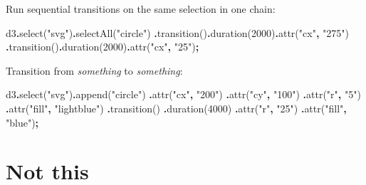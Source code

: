 \documentclass[
  openany]{book}
\newenvironment{Shaded}{\begin{snugshade}}{\end{snugshade}}
\newcommand{\DecValTok}[1]{\textcolor[rgb]{0.00,0.00,0.81}{#1}}
\newcommand{\FunctionTok}[1]{\textcolor[rgb]{0.00,0.00,0.00}{#1}}
\newcommand{\NormalTok}[1]{#1}
\newcommand{\OperatorTok}[1]{\textcolor[rgb]{0.81,0.36,0.00}{\textbf{#1}}}
\newcommand{\StringTok}[1]{\textcolor[rgb]{0.31,0.60,0.02}{#1}}
\begin{document}
Run sequential transitions on the same selection in one chain:

\begin{Shaded}
\begin{Highlighting}[]
\NormalTok{d3}\OperatorTok{.}\FunctionTok{select}\NormalTok{(}\StringTok{"svg"}\NormalTok{)}\OperatorTok{.}\FunctionTok{selectAll}\NormalTok{(}\StringTok{"circle"}\NormalTok{)}
  \OperatorTok{.}\FunctionTok{transition}\NormalTok{()}\OperatorTok{.}\FunctionTok{duration}\NormalTok{(}\DecValTok{2000}\NormalTok{)}\OperatorTok{.}\FunctionTok{attr}\NormalTok{(}\StringTok{"cx"}\OperatorTok{,} \StringTok{"275"}\NormalTok{)}
  \OperatorTok{.}\FunctionTok{transition}\NormalTok{()}\OperatorTok{.}\FunctionTok{duration}\NormalTok{(}\DecValTok{2000}\NormalTok{)}\OperatorTok{.}\FunctionTok{attr}\NormalTok{(}\StringTok{"cx"}\OperatorTok{,} \StringTok{"25"}\NormalTok{)}\OperatorTok{;}
\end{Highlighting}
\end{Shaded}

Transition from \emph{something} to \emph{something}:

\begin{Shaded}
\begin{Highlighting}[]
\NormalTok{d3}\OperatorTok{.}\FunctionTok{select}\NormalTok{(}\StringTok{"svg"}\NormalTok{)}\OperatorTok{.}\FunctionTok{append}\NormalTok{(}\StringTok{"circle"}\NormalTok{)}
    \OperatorTok{.}\FunctionTok{attr}\NormalTok{(}\StringTok{"cx"}\OperatorTok{,} \StringTok{"200"}\NormalTok{)}
    \OperatorTok{.}\FunctionTok{attr}\NormalTok{(}\StringTok{"cy"}\OperatorTok{,} \StringTok{"100"}\NormalTok{)}
    \OperatorTok{.}\FunctionTok{attr}\NormalTok{(}\StringTok{"r"}\OperatorTok{,} \StringTok{"5"}\NormalTok{)}
    \OperatorTok{.}\FunctionTok{attr}\NormalTok{(}\StringTok{"fill"}\OperatorTok{,} \StringTok{"lightblue"}\NormalTok{)}
    \OperatorTok{.}\FunctionTok{transition}\NormalTok{()}
    \OperatorTok{.}\FunctionTok{duration}\NormalTok{(}\DecValTok{4000}\NormalTok{)}
    \OperatorTok{.}\FunctionTok{attr}\NormalTok{(}\StringTok{"r"}\OperatorTok{,} \StringTok{"25"}\NormalTok{)}
    \OperatorTok{.}\FunctionTok{attr}\NormalTok{(}\StringTok{"fill"}\OperatorTok{,} \StringTok{"blue"}\NormalTok{)}\OperatorTok{;}
\end{Highlighting}
\end{Shaded}

\hypertarget{not-this}{%
\section{Not this}\label{not-this}}
\end{document}
